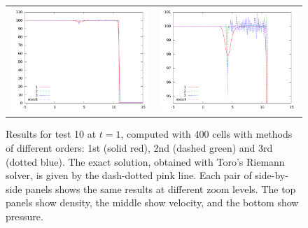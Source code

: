 \documentclass[10pt]{article}
\begin{document}
\begin{figure}[h]
\begin{center}
\begin{tabular}{cc}
      \includegraphics[width=.4\textwidth]{prs_T10.png} &	
      \includegraphics[width=.4\textwidth]{prs10zoom.png} \\
	\end{tabular}	
  \end{center}
  \caption{Results for test 10 at $t=1$, computed with 400 cells with methods of different orders: 1st (solid red), 2nd (dashed green) and 3rd (dotted blue). The exact solution, obtained with Toro's Riemann solver, is given by the dash-dotted pink line. Each pair of side-by-side panels shows the same results at different zoom levels. The top panels show density, the middle show velocity, and the bottom show pressure.}
\end{figure}



\clearpage
\end{document}
